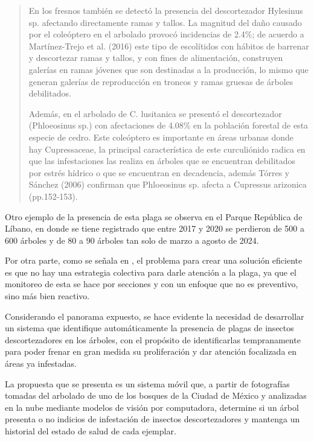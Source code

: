 \begin{quote}
En los fresnos también se detectó la presencia del descortezador Hylesinus sp. afectando directamente ramas y tallos. La magnitud del daño causado por el coleóptero en el arbolado provocó incidencias de 2.4\%; de acuerdo a Martínez-Trejo et al. (2016) este tipo de escolítidos con hábitos de barrenar y descortezar ramas y tallos, y con fines de alimentación, construyen galerías en ramas jóvenes que son destinadas a la producción, lo mismo que generan galerías de reproducción en troncos y ramas gruesas de árboles debilitados.

Además, en el arbolado de C. lusitanica se presentó el descortezador (Phloeosinus sp.) con afectaciones de 4.08\% en la población forestal de esta especie de cedro. Este coleóptero es importante en áreas urbanas donde hay Cupressaceae, la principal característica de este curculiónido radica en que las infestaciones las realiza en árboles que se encuentran debilitados por estrés hídrico o que se encuentran en decadencia, además Tórres y Sánchez (2006) confirman que Phloeosinus sp. afecta a Cupressus arizonica (pp.152-153).
\end{quote}

Otro ejemplo de la presencia de esta plaga se observa en el Parque República de Líbano, en donde se tiene registrado que entre 2017 y 2020 se perdieron de 500 a 600 árboles y de 80 a 90 árboles tan solo de marzo a agosto de 2024. \cite{rn2025radiografia}

Por otra parte, como se señala en \cite{rn2025radiografia}, el problema para crear una solución eficiente es que no hay una estrategia colectiva para darle atención a la plaga, ya que el monitoreo de esta se hace por secciones y con un enfoque que no es preventivo, sino más bien reactivo.

Considerando el panorama expuesto, se hace evidente la necesidad de desarrollar un sistema que identifique automáticamente la presencia de plagas de insectos descortezadores en los árboles, con el propósito de identificarlas tempranamente para poder frenar en gran medida su proliferación y dar atención focalizada en áreas ya infestadas.

La propuesta que se presenta es un sistema móvil que, a partir de fotografías tomadas del arbolado de uno de los bosques de la Ciudad de México y analizadas en la nube mediante modelos de visión por computadora, determine si un árbol presenta o no indicios de infestación de insectos descortezadores y mantenga un historial del estado de salud de cada ejemplar.

